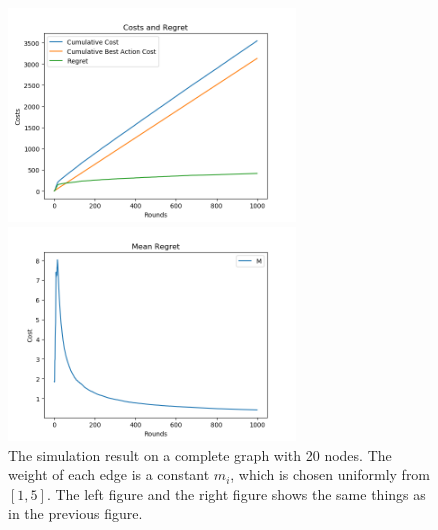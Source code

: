 \documentclass{article}
\theoremstyle{plain}
\theoremstyle{definition}
\theoremstyle{remark}
\begin{document}
    \begin{figure}[htbp!]
        \begin{minipage}[h]{0.5\linewidth}
            \centering
            \includegraphics[width=3in]{simple-cost-regret-uni.png}
        \end{minipage}
        \begin{minipage}[h]{0.5\linewidth}
            \centering
            \includegraphics[width=3in]{simple-mean-regret-uni.png}
        \end{minipage}
        \caption{The simulation result on a complete graph with 20 nodes. The weight of each edge is a constant $m_i$, which is chosen uniformly from $[1,5]$. The left figure and the right figure shows the same things as in the previous figure.}
        \label{center-uni}
    \end{figure}
\end{document}
